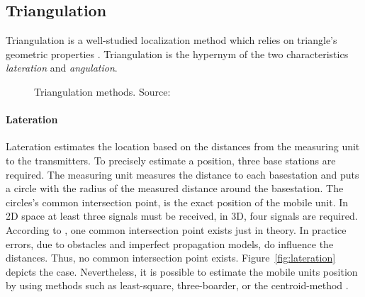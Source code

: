 \subsection{Triangulation}\label{sec:fund_trilateration}
Triangulation is a well-studied localization method which relies on triangle's geometric properties \citep{IEEE:survey_wireless_indoor_pos, wang:bt_pos}. Triangulation is the hypernym of the two characteristics \emph{lateration} and \emph{angulation}.

\begin{figure}[width=0.9\textwidth, height=0.4\textheight]
\caption {Triangulation methods. Source:~\citep{wang:bt_pos}}
\label{fig:triangulation}
\end{figure}

\paragraph{Lateration} Lateration estimates the location based on the distances from the measuring unit to the transmitters. To precisely estimate a position, three base stations are required. The measuring unit measures the distance to each basestation and puts a circle with the radius of the measured distance around the basestation. The circles's common intersection point, is the exact position of the mobile unit. In 2D space at least three signals must be received, in 3D, four signals are required. According to \citet{wang:bt_pos}, one common intersection point exists just in theory. In practice errors, due to obstacles and imperfect propagation models, do influence the distances. Thus, no common intersection point exists. Figure~\ref{fig:lateration} depicts the case. Nevertheless, it is possible to estimate the mobile units position by using methods such as least-square, three-boarder, or the centroid-method \citep{wang:bt_pos, IEEE:survey_wireless_indoor_pos}.  


